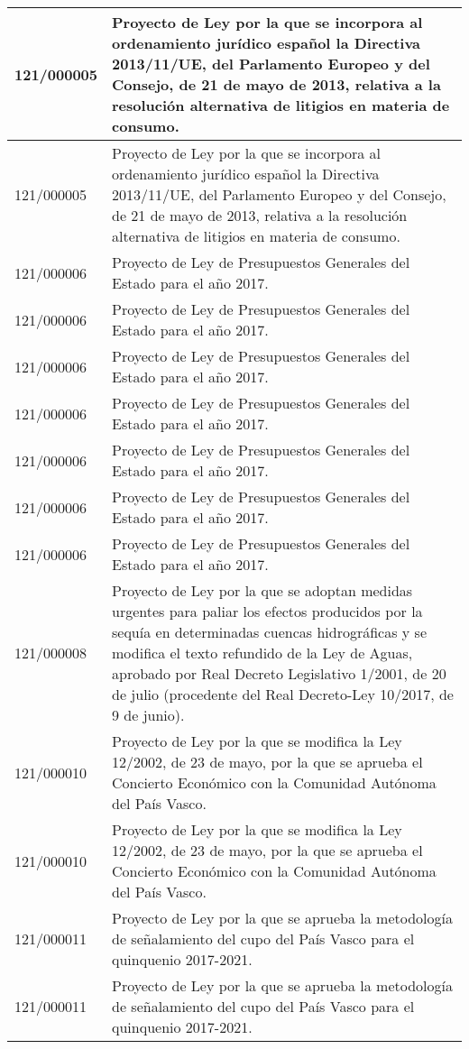 {\begin{table}[H]
\begin{center}
\begin{tabularx}{\linewidth}{| l | X |}
\hline
121/000005 & Proyecto de Ley por la que se incorpora al ordenamiento jurídico español la Directiva 2013/11/UE, del Parlamento Europeo y del Consejo, de 21 de mayo de 2013, relativa a la resolución alternativa de litigios en materia de consumo. \\
\hline
121/000005 & Proyecto de Ley por la que se incorpora al ordenamiento jurídico español la Directiva 2013/11/UE, del Parlamento Europeo y del Consejo, de 21 de mayo de 2013, relativa a la resolución alternativa de litigios en materia de consumo. \\
\hline
121/000006 & Proyecto de Ley de Presupuestos Generales del Estado para el año 2017. \\
\hline
121/000006 & Proyecto de Ley de Presupuestos Generales del Estado para el año 2017. \\
\hline
121/000006 & Proyecto de Ley de Presupuestos Generales del Estado para el año 2017. \\
\hline
121/000006 & Proyecto de Ley de Presupuestos Generales del Estado para el año 2017. \\
\hline
121/000006 & Proyecto de Ley de Presupuestos Generales del Estado para el año 2017. \\
\hline
121/000006 & Proyecto de Ley de Presupuestos Generales del Estado para el año 2017. \\
\hline
121/000006 & Proyecto de Ley de Presupuestos Generales del Estado para el año 2017. \\
\hline
121/000008 & Proyecto de Ley por la que se adoptan medidas urgentes para paliar los efectos producidos por la sequía en determinadas cuencas hidrográficas y se modifica el texto refundido de la Ley de Aguas, aprobado por Real Decreto Legislativo 1/2001, de 20 de julio (procedente del Real Decreto-Ley 10/2017, de 9 de junio). \\
\hline
121/000010 & Proyecto de Ley por la que se modifica la Ley 12/2002, de 23 de mayo, por la que se aprueba el Concierto Económico con la Comunidad Autónoma del País Vasco. \\
\hline
121/000010 & Proyecto de Ley por la que se modifica la Ley 12/2002, de 23 de mayo, por la que se aprueba el Concierto Económico con la Comunidad Autónoma del País Vasco. \\
\hline
121/000011 & Proyecto de Ley por la que se aprueba la metodología de señalamiento del cupo del País Vasco para el quinquenio 2017-2021. \\
\hline
121/000011 & Proyecto de Ley por la que se aprueba la metodología de señalamiento del cupo del País Vasco para el quinquenio 2017-2021. \\

\end{tabularx}
\end{center}
\end{table}}
